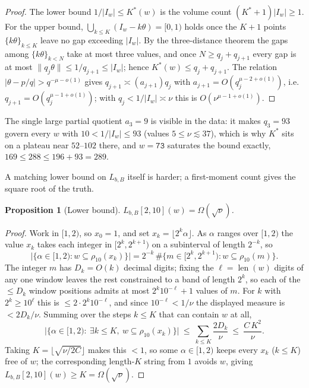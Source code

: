 \documentclass[11pt]{article}
\theoremstyle{plain}
\newtheorem{proposition}{Proposition}
\theoremstyle{definition}
\theoremstyle{remark}
\DeclareMathOperator{\len}{len}
\newcommand{\Lbb}{L_{b,B}}
\begin{document}
\begin{proof}
The lower bound $1/|I_w|\le K^{*}(w)$ is the volume count $(K^{*}+1)|I_w|\ge1$. For the upper bound, $\bigcup_{k\le K}(I_w-k\theta)=[0,1)$ holds once the $K+1$ points $\{k\theta\}_{k\le K}$ leave no gap exceeding $|I_w|$. By the three-distance theorem the gaps among $\{k\theta\}_{k<N}$ take at most three values, and once $N\ge q_j+q_{j+1}$ every gap is at most $\lVert q_j\theta\rVert\le1/q_{j+1}\le|I_w|$; hence $K^{*}(w)\le q_j+q_{j+1}$. The relation $|\theta-p/q|>q^{-\mu-o(1)}$ gives $q_{j+1}\asymp(a_{j+1})q_j$ with $a_{j+1}=O(q_j^{\mu-2+o(1)})$, i.e.\ $q_{j+1}=O(q_j^{\mu-1+o(1)})$; with $q_j<1/|I_w|\asymp\nu$ this is $O(\nu^{\mu-1+o(1)})$.
\end{proof}

The single large partial quotient $a_3=9$ is visible in the data: it makes $q_3=93$ govern every $w$ with $10<1/|I_w|\le93$ (values $5\le\nu\lesssim37$), which is why $K^{*}$ sits on a plateau near $52$--$102$ there, and $w=\texttt{73}$ saturates the bound exactly, $169\le288\le196+93=289$.

A matching lower bound on $\Lbb$ itself is harder; a first-moment count gives the square root of the truth.

\begin{proposition}[Lower bound]\label{prop:lower}
$\Lbb[2,10](w)=\Omega(\sqrt{\nu})$.
\end{proposition}

\begin{proof}
Work in $[1,2)$, so $x_0=1$, and set $x_k=\lfloor2^{k}\alpha\rfloor$. As $\alpha$ ranges over $[1,2)$ the value $x_k$ takes each integer in $[2^{k},2^{k+1})$ on a subinterval of length $2^{-k}$, so
\[
\bigl|\{\alpha\in[1,2): w\subseteq\rho_{10}(x_k)\}\bigr|=2^{-k}\,\#\{m\in[2^{k},2^{k+1}):w\subseteq\rho_{10}(m)\}.
\]
The integer $m$ has $D_k=O(k)$ decimal digits; fixing the $\ell=\len(w)$ digits of any one window leaves the rest constrained to a band of length $2^{k}$, so each of the $\le D_k$ window positions admits at most $2^{k}10^{-\ell}+1$ values of $m$. For $k$ with $2^{k}\ge10^{\ell}$ this is $\le2\cdot2^{k}10^{-\ell}$, and since $10^{-\ell}<1/\nu$ the displayed measure is $<2D_k/\nu$. Summing over the steps $k\le K$ that can contain $w$ at all,
\[
\bigl|\{\alpha\in[1,2):\ \exists k\le K,\ w\subseteq\rho_{10}(x_k)\}\bigr|\ \le\ \sum_{k\le K}\frac{2D_k}{\nu}\ \le\ \frac{C\,K^{2}}{\nu}.
\]
Taking $K=\lfloor\sqrt{\nu/2C}\rfloor$ makes this $<1$, so some $\alpha\in[1,2)$ keeps every $x_k$ ($k\le K$) free of $w$; the corresponding length-$K$ string from $1$ avoids $w$, giving $\Lbb[2,10](w)\ge K=\Omega(\sqrt\nu)$.
\end{proof}
\end{document}
